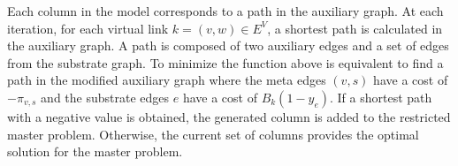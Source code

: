 \documentclass[12pt]{article}
\begin{document}
Each column in the model corresponds to a path in the auxiliary graph. At each iteration, for each virtual link $k = (v,w) \in E^V$, a shortest path is calculated in the auxiliary graph. A path is composed of two auxiliary edges and a set of edges from the substrate graph. To minimize the function above is equivalent to find a path in the modified auxiliary graph where the meta edges $(v,s)$ have a cost of $-\pi_{v,s}$ and the substrate edges $e$ have a cost of $B_{k}(1 - y_{e})$. If a shortest path with a negative value is obtained, the generated column is added to the restricted master problem. Otherwise, the current set of columns provides the optimal solution for the master problem.

\end{document}
